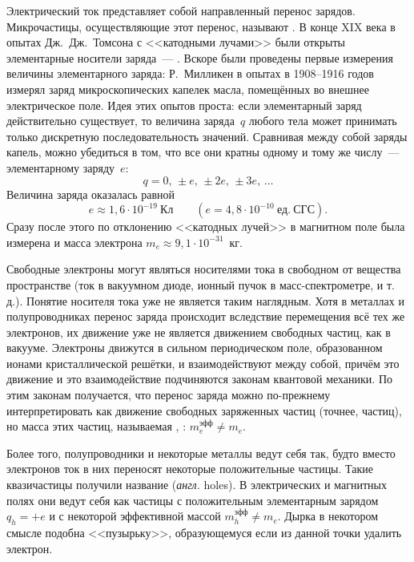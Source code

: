 Электрический ток представляет собой направленный перенос зарядов. Микрочастицы,
осуществляющие этот перенос, называют . В конце
XIX века в опытах Дж.~Дж.~Томсона с <<катодными лучами>> были открыты
элементарные носители заряда~--- . Вскоре были проведены
первые измерения величины элементарного заряда: Р.~Милликен
в опытах в 1908--1916 годов измерял заряд микроскопических капелек масла,
помещённых во внешнее электрическое поле. Идея этих опытов проста:
если элементарный заряд действительно существует, то величина заряда~$q$
любого тела может принимать только дискретную последовательность значений.
Сравнивая между собой заряды капель, можно убедиться в том, что все они
кратны одному и тому же числу~--- элементарному заряду~$e$:
\begin{equation*}
    q = 0,\,\pm e,\,\pm2e,\,\pm3e,\, \ldots
\end{equation*}
Величина заряда оказалась равной
\[
e\approx1,6\cdot 10^{-19}~Кл\qquad (e=4,8\cdot 10^{-10}~ед.~СГС).
\]
Сразу после этого по отклонению <<катодных лучей>> в магнитном поле была
измерена и масса электрона $m_e\approx 9,1\cdot 10^{-31}$~кг.

Свободные электроны могут являться носителями тока в свободном от вещества
пространстве (ток в вакуумном диоде, ионный пучок в масс-спектрометре, и
т.\,д.). Понятие носителя тока  уже не является таким
наглядным. Хотя в металлах и полупроводниках перенос заряда происходит
вследствие перемещения всё тех же электронов, их движение уже не является
движением свободных частиц, как в вакууме. Электроны движутся в сильном
периодическом поле, образованном ионами кристаллической решётки, и
взаимодействуют между собой, причём это движение и это взаимодействие
подчиняются законам квантовой механики. По этим законам получается, что перенос
заряда можно по-прежнему интерпретировать как движение свободных заряженных
частиц (точнее, частиц), но масса этих частиц, называемая
, : $m_{e}^{эфф}\ne m_e$.

Более того, полупроводники и некоторые металлы
ведут себя так, будто вместо электронов ток в них переносят некоторые
положительные частицы. Такие квазичастицы получили название 
(\emph{англ.} holes).
В электрических и магнитных полях они ведут себя как частицы с положительным
элементарным зарядом $q_h=+e$ и с некоторой эффективной массой
$m_h^{эфф}\ne m_e$. Дырка в некотором смысле подобна <<пузырьку>>, образующемуся
если из данной точки удалить электрон.

